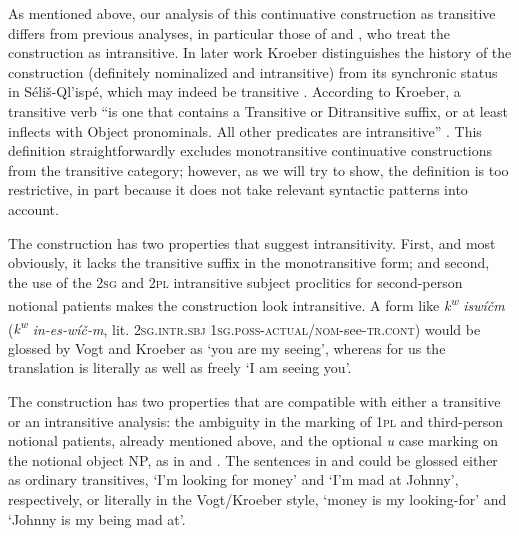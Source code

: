 \documentclass[output=paper,colorlinks,citecolor=brown]{langscibook}
\begin{document}
As mentioned above, our analysis of this continuative construction as
transitive differs from previous analyses, in particular those of
\citet{Kroeber:1991} and \citet{Vogt:1940}, who treat the construction
as intransitive.  In later work Kroeber distinguishes the history of
the construction (definitely nominalized and intransitive) from its
synchronic status in S\'eli\v{s}-Ql'isp\'e, which may indeed be
transitive \citep[357]{Kroeber:1999}.  According to Kroeber, a transitive verb “is
one that contains a Transitive or Ditransitive suffix, or at least
inflects with Object pronominals.  All other predicates are
intransitive” \citep[29]{Kroeber:1991}.  This definition straightforwardly excludes
monotransitive continuative constructions from the transitive
category; however, as we will try to show, the definition is too
restrictive, in part because it does not take relevant syntactic
patterns into account.


The construction has two properties that suggest intransitivity.
First, and most obviously, it lacks the transitive suffix in the
monotransitive form; and second, the use of the \textsc{2sg} and \textsc{2pl}
intransitive subject proclitics for second-person notional patients
makes the construction look intransitive.  A form like
\emph{{k\textsuperscript w} isw\'i\v{c}m} (\emph{{k\textsuperscript w}
in-es-w\'i\v{c}-m}, lit. \textsc{2sg}.\textsc{intr.sbj} \textsc{1sg}.\textsc{poss}-\textsc{actual/nom}-see-\textsc{tr.cont}) would be glossed by Vogt and
Kroeber as `you are my seeing', whereas for us the translation is
literally as well as freely `I am seeing you'.

\begin{sloppypar}
The construction has two properties that are compatible with
either a transitive or an intransitive analysis: the ambiguity in the
marking of \textsc{1pl} and third-person notional patients, already mentioned
above, and the optional \emph{{\textltilde}u} case marking on the notional
object NP, as in  and .  
The sentences in  and  could be
glossed either as ordinary transitives, `I'm looking for money' and
`I'm mad at Johnny', respectively, or literally in the Vogt\slash Kroeber
style, `money is my looking-for' and `Johnny is my being mad at'.
\end{sloppypar}
\end{document}
